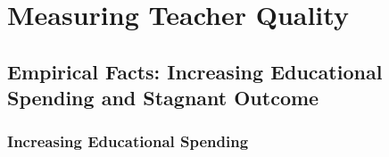 \chapter{Measuring Teacher Quality}


\section{Empirical Facts: Increasing Educational Spending and Stagnant Outcome}

    \subsection{Increasing Educational Spending}
        
